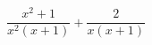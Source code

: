 \begin{ex}[type=expression]
	\begin{condition}
		\(\dfrac{x^2+1}{x^2(x+1)}+\dfrac{2}{x(x+1)}\)
	\end{condition}
\end{ex}